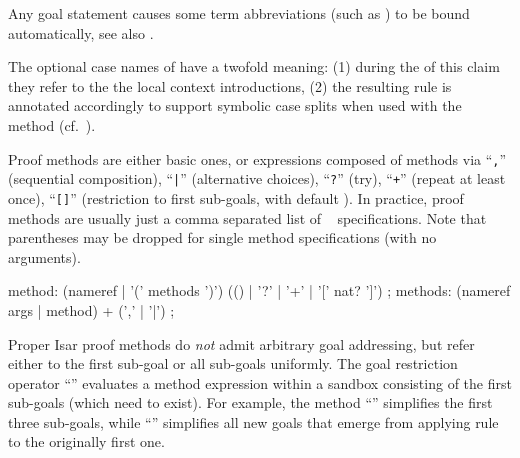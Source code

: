 \begin{isabellebody}
\begin{isamarkuptext}
\begin{description}
  \end{description}

  Any goal statement causes some term abbreviations (such as
  \hyperlink{variable.?thesis}{\mbox{}}) to be bound automatically, see also
  .

  The optional case names of \hyperlink{element.obtains}{\mbox{}} have a twofold
  meaning: (1) during the of this claim they refer to the the local
  context introductions, (2) the resulting rule is annotated
  accordingly to support symbolic case splits when used with the
  \hyperlink{method.cases}{\mbox{}} method (cf.\ ).%
\end{isamarkuptext}%
\isamarkuptrue%
%
\isamarkuptrue%
%
\isamarkuptrue%
%
\begin{isamarkuptext}%
Proof methods are either basic ones, or expressions composed of
  methods via ``\verb|,|'' (sequential composition),
  ``\verb||\verb,|,\verb||'' (alternative choices), ``\verb|?|'' 
  (try), ``\verb|+|'' (repeat at least once), ``\verb|[|\verb|]|'' (restriction to first 
  sub-goals, with default ).  In practice, proof
  methods are usually just a comma separated list of
  ~ specifications.  Note that
  parentheses may be dropped for single method specifications (with no
  arguments).

  \begin{rail}
    method: (nameref | '(' methods ')') (() | '?' | '+' | '[' nat? ']')
    ;
    methods: (nameref args | method) + (',' | '|')
    ;
  \end{rail}

  Proper Isar proof methods do \emph{not} admit arbitrary goal
  addressing, but refer either to the first sub-goal or all sub-goals
  uniformly.  The goal restriction operator ``''
  evaluates a method expression within a sandbox consisting of the
  first  sub-goals (which need to exist).  For example, the
  method ``'' simplifies the first three
  sub-goals, while ``'' simplifies all
  new goals that emerge from applying rule  to the
  originally first one.


\end{isamarkuptext}
\end{isabellebody}
